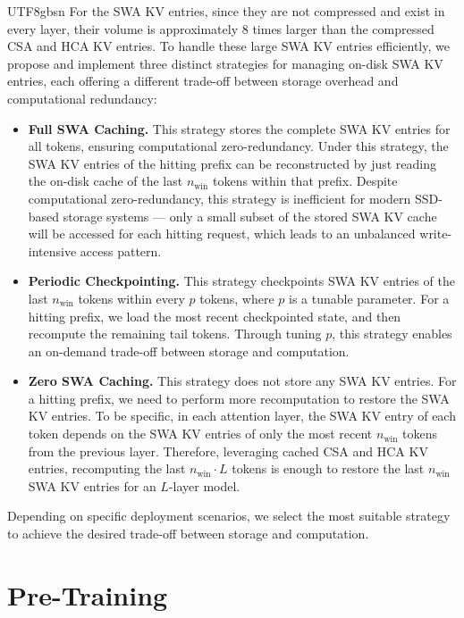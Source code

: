 \documentclass[11pt, a4paper, logo, copyright, nonumbering]{deepseek}
\newcommand{\hca}{HCA}
\newcommand{\csa}{CSA}
\begin{document}
\begin{CJK*}{UTF8}{gbsn}
For the SWA KV entries, since they are not compressed and exist in every layer, their volume is approximately 8 times larger than the compressed \csa{} and \hca{} KV entries. 
To handle these large SWA KV entries efficiently, we propose and implement three distinct strategies for managing on-disk SWA KV entries, each offering a different trade-off between storage overhead and computational redundancy:
\begin{itemize}[topsep=0pt]
    \item \textbf{Full SWA Caching.}
    This strategy stores the complete SWA KV entries for all tokens, ensuring computational zero-redundancy.
    Under this strategy, the SWA KV entries of the hitting prefix can be reconstructed by just reading the on-disk cache of the last $n_{\text{win}}$ tokens within that prefix.
    Despite computational zero-redundancy, this strategy is inefficient for modern SSD-based storage systems --- only a small subset of the stored SWA KV cache will be accessed for each hitting request, which leads to an unbalanced write-intensive access pattern. 
    \item \textbf{Periodic Checkpointing.} 
    This strategy checkpoints SWA KV entries of the last $n_{\text{win}}$ tokens within every $p$ tokens, where $p$ is a tunable parameter. 
    For a hitting prefix, we load the most recent checkpointed state, and then recompute the remaining tail tokens. 
    Through tuning $p$, this strategy enables an on-demand trade-off between storage and computation. 
    \item \textbf{Zero SWA Caching.} 
    This strategy does not store any SWA KV entries. 
    For a hitting prefix, we need to perform more recomputation to restore the SWA KV entries. 
    To be specific, in each attention layer, the SWA KV entry of each token depends on the SWA KV entries of only the most recent $n_{\text{win}}$ tokens from the previous layer.
    Therefore, leveraging cached \csa{} and \hca{} KV entries, recomputing the last $n_{\text{win}} \cdot L$ tokens is enough to restore the last $n_{\text{win}}$ SWA KV entries for an $L$-layer model. 
\end{itemize}
Depending on specific deployment scenarios, we select the most suitable strategy to achieve the desired trade-off between storage and computation.

\section{Pre-Training}
\label{sec:pre-training}


\end{CJK*}
\end{document}
